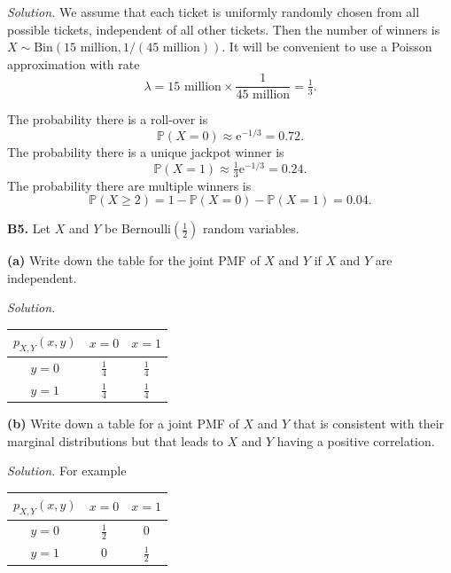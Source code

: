 \documentclass[
  a4paper,
]{book}
\theoremstyle{definition}
\theoremstyle{definition}
\theoremstyle{definition}
\theoremstyle{definition}
\theoremstyle{remark}
\begin{document}
\begin{myanswers}
\emph{Solution.}
We assume that each ticket is uniformly randomly chosen from all possible tickets, independent of all other tickets. Then the number of winners is \(X \sim \text{Bin}(15 \text{ million}, 1/(45 \text{ million}))\).
It will be convenient to use a Poisson approximation with rate
\[ \lambda = 15 \text{ million} \times \frac{1}{45 \text{ million}} = \tfrac13 .  \]

The probability there is a roll-over is
\[ \mathbb P(X = 0) \approx \mathrm e^{-1/3} = 0.72 . \]
The probability there is a unique jackpot winner is
\[ \mathbb P(X = 1) \approx \tfrac13 \mathrm e^{-1/3} = 0.24 . \]
The probability there are multiple winners is
\[ \mathbb P(X \geq 2) = 1 - \mathbb P(X = 0) - \mathbb P(X = 1) = 0.04  . \]

\end{myanswers}

\textbf{B5.} Let \(X\) and \(Y\) be Bernoulli\((\frac12)\) random variables.

\textbf{(a)} Write down the table for the joint PMF of \(X\) and \(Y\) if \(X\) and \(Y\) are independent.

\begin{myanswers}

\emph{Solution.}

\begin{longtable}[]{@{}ccc@{}}
\toprule()
\(p_{X,Y}(x,y)\) & \(x = 0\) & \(x = 1\) \\
\midrule()
\endhead
\(y = 0\) & \(\frac14\) & \(\frac14\) \\
\(y = 1\) & \(\frac14\) & \(\frac14\) \\
\bottomrule()
\end{longtable}

\end{myanswers}

\textbf{(b)} Write down a table for a joint PMF of \(X\) and \(Y\) that is consistent with their marginal distributions but that leads to \(X\) and \(Y\) having a positive correlation.

\begin{myanswers}

\emph{Solution.} For example

\begin{longtable}[]{@{}ccc@{}}
\toprule()
\(p_{X,Y}(x,y)\) & \(x = 0\) & \(x = 1\) \\
\midrule()
\endhead
\(y = 0\) & \(\frac12\) & \(0\) \\
\(y = 1\) & \(0\) & \(\frac12\) \\
\bottomrule()
\end{longtable}

\end{myanswers}
\end{document}

